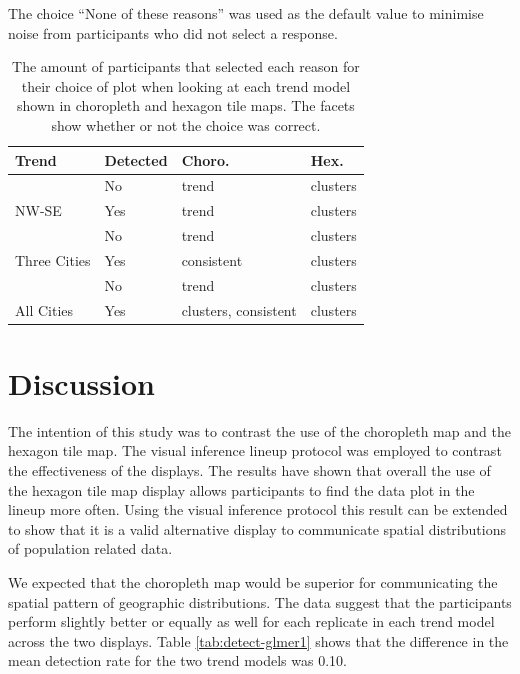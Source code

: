 \documentclass{monashthesis}
\begin{document}
The choice ``None of these reasons'' was used as the default value to minimise noise from participants who did not select a response.

\begin{table}[!h]

\caption{\label{tab:reason}The amount of participants that selected each reason for their choice of plot when looking at each trend model shown in choropleth and hexagon tile maps. The facets show whether or not the choice was correct.}
\centering
\begin{tabular}[t]{llll}
\toprule
Trend & Detected & Choro. & Hex.\\
\midrule
 & No & trend & clusters\\
\cmidrule{2-4}
\multirow{-2}{*}{\raggedright\arraybackslash NW-SE} & Yes & trend & clusters\\
\cmidrule{1-4}
 & No & trend & clusters\\
\cmidrule{2-4}
\multirow{-2}{*}{\raggedright\arraybackslash Three Cities} & Yes & consistent & clusters\\
\cmidrule{1-4}
 & No & trend & clusters\\
\cmidrule{2-4}
\multirow{-2}{*}{\raggedright\arraybackslash All Cities} & Yes & clusters, consistent & clusters\\
\bottomrule
\end{tabular}
\end{table}

\hypertarget{discussion}{%
\section{Discussion}\label{discussion}}

The intention of this study was to contrast the use of the choropleth map and the hexagon tile map. The visual inference lineup protocol was employed to contrast the effectiveness of the displays. The results have shown that overall the use of the hexagon tile map display allows participants to find the data plot in the lineup more often.
Using the visual inference protocol this result can be extended to show that it is a valid alternative display to communicate spatial distributions of population related data.

We expected that the choropleth map would be superior for communicating the spatial pattern of geographic distributions. The data suggest that the participants perform slightly better or equally as well for each replicate in each trend model across the two displays. Table \ref{tab:detect-glmer1} shows that the difference in the mean detection rate for the two trend models was 0.10.
\end{document}
